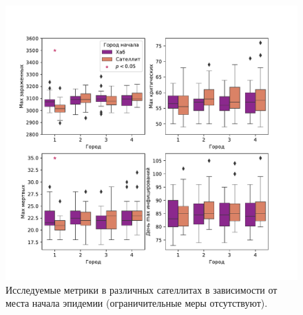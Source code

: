 \documentclass[a4paper,12pt]{article} %
\begin{document}
\begin{figure}[H]
    \centering
    \includegraphics[width=\linewidth]{images/satellites_boxs.pdf}
    \caption{Исследуемые метрики в различных сателлитах в зависимости от места начала эпидемии (ограничительные меры отсутствуют).}
    \label{pic:satellites_boxs}
\end{figure}
\end{document}

